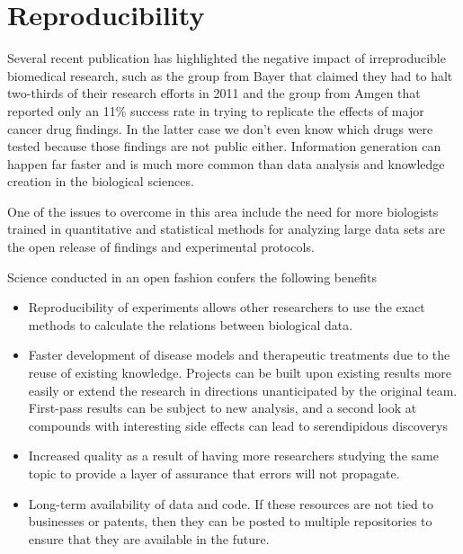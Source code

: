 \section{Reproducibility}

Several recent publication has highlighted the negative impact of irreproducible biomedical research, such as the group from Bayer that claimed they had to halt two-thirds of their research efforts in 2011 \cite{Prinz2011} and the group from Amgen that reported only an 11\% success rate in trying to replicate the effects of major cancer drug findings. \cite{Begley2012} In the latter case we don't even know which drugs were tested because those findings are not public either. Information generation can happen far faster and is much more common than data analysis and knowledge creation in the biological sciences.

One of the issues to overcome in this area include the need for more biologists trained in quantitative and statistical methods for analyzing large data sets are the open release of findings and experimental protocols. 

Science conducted in an open fashion confers the following benefits

\begin{itemize}

\item Reproducibility of experiments allows other researchers to use the exact methods to calculate the relations between biological data.

\item Faster development of disease models and therapeutic treatments due to the reuse of existing knowledge. Projects can be built upon existing results more easily or extend the research in directions unanticipated by the original team. First-pass results can be subject to new analysis, and a second look at compounds with interesting side effects can lead to serendipidous discoverys

\item Increased quality as a result of having more researchers studying the same topic to provide a layer of assurance that errors will not propagate.

\item Long-term availability of data and code. If these resources are not tied to businesses or patents, then they can be posted to multiple repositories to ensure that they are available in the future.
\cite{Prlic2012}

\end{itemize}

